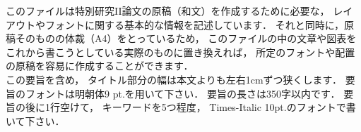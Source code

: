 このファイルは特別研究II論文の原稿（和文）を作成するために必要な，
レイアウトやフォントに関する基本的な情報を記述しています．
それと同時に，原稿そのものの体裁（A4）をとっているため，
このファイルの中の文章や図表をこれから書こうとしている実際のものに置き換えれば，
所定のフォントや配置の原稿を容易に作成することができます．
\\
この要旨を含め，
タイトル部分の幅は本文よりも左右1cmずつ狭くします．
要旨のフォントは明朝体9 pt.を用いて下さい．
要旨の長さは350字以内です．
要旨の後に1行空けて，
キーワードを5つ程度，
Times-Italic 10pt.のフォントで書いて下さい．
